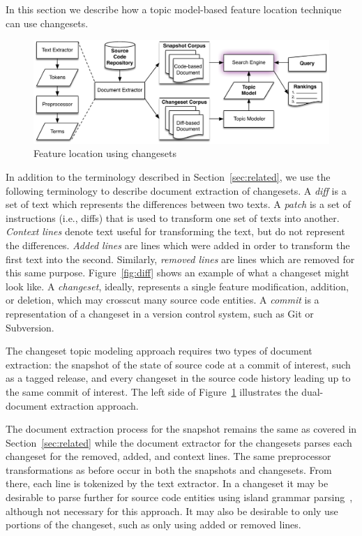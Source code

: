 
In this section we describe how a topic model-based feature location
technique can use changesets.

\begin{figure}
\centerline{\includegraphics[width=.75\textwidth]{figures/changeset-flt}}
\caption{Feature location using changesets}
\label{fig:changeset}
\end{figure}

In addition to the terminology described in Section~\ref{sec:related},
we use the following terminology to describe document extraction of changesets.
A \textit{diff} is a set of text which represents the differences between two texts.
A \textit{patch} is a set of instructions (i.e., diffs) that is used to transform one set of texts into another.
\textit{Context lines} denote text useful for transforming the text, but do not represent the differences.
\textit{Added lines} are lines which were added in order to transform the first text into the second.
Similarly, \textit{removed lines} are lines which are removed for this same purpose.
Figure~\ref{fig:diff} shows an example of what a changeset might look like.
A \textit{changeset}, ideally, represents a single feature modification,
addition, or deletion, which may crosscut many source code entities.
A \textit{commit} is a representation of a changeset in a version control system, such as Git or Subversion.

The changeset topic modeling approach requires two types of document extraction:
the snapshot of the state of source code at a commit of interest, such as a tagged release,
and every changeset in the source code history leading up to the same commit of interest.
The left side of Figure~\ref{fig:changeset} illustrates the dual-document extraction approach.

The document extraction process for the snapshot remains the same as covered in Section~\ref{sec:related} while the
document extractor for the changesets parses each changeset for the removed, added, and context lines.
The same preprocessor transformations as before occur in both the snapshots and changesets.
From there, each line is tokenized by the text extractor.
In a changeset it may be desirable to parse further for source code entities using island grammar parsing~\cite{Moonen:2001},
although not necessary for this approach.
It may also be desirable to only use portions of the changeset, such as only using added or removed lines.

